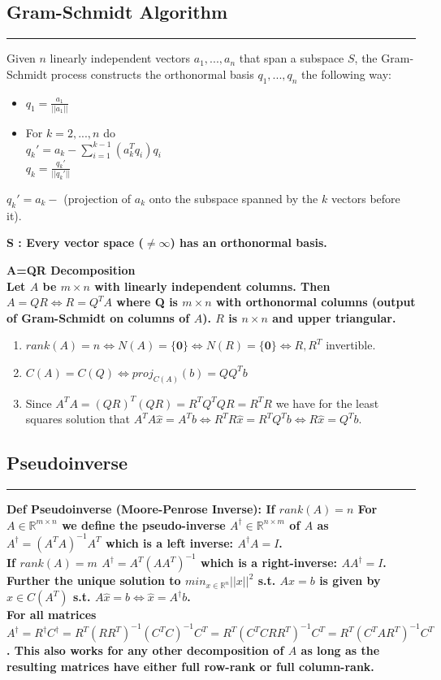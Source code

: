 \documentclass[7pt,landscape, margin = 0.1mm]{article}
\newcommand*{\mysubsection}[1]{\vspace{-2mm}\color{chaptercolor}\subsection{ #1 }
\vspace{-1mm}\hrule\vspace{1.5mm}\color{black}
\vspace{2mm}}
\newcommand{\COL}[1]{ \color{chaptercolor} \bf{#1}\color{black}     \\}
\newcommand{\DEF}[2]{\color{chaptercolor}\bf{Def #1}:\color{black}    \hspace{0.2cm} #2}
\newcommand{\SA}[2]{\color{chaptercolor}\bf{S #1}:\color{black}    \hspace{0.2cm} #2}
\begin{document}
\begin{multicols}{4}
\begin{flushleft}
{{\mysubsection{Gram-Schmidt Algorithm}
Given $n$ linearly independent vectors $a_1,...,a_n$ that span a subspace $S$, the Gram-Schmidt process constructs the orthonormal basis $q_1,...,q_n$ the following way:
\begin{itemize}
    \item $q_1=\frac{a_1}{||a_1||}$
    \item For $k=2,...,n$ do\\
    \hspace{1.8em}$q_k'=a_k-\sum_{i=1}^{k-1}(a_k^Tq_i)q_i$\\
    \hspace{1.8em}$q_k=\frac{q_k'}{||q_k'||}$
\end{itemize}
$q_k' = a_k -$ (projection of $a_k$ onto the subspace spanned by the $k$ vectors before it).

\SA{}{Every vector space ($\not=\infty$) has an orthonormal basis.}

\COL{A=QR Decomposition}
Let $A$ be $m\times n$ with linearly independent columns. Then $A=QR \Leftrightarrow R=Q^TA$ where Q is $m\times n$ with orthonormal columns (output of Gram-Schmidt on columns of $A$). $R$ is $n\times n$ and upper triangular.
\begin{enumerate}[nolistsep]
    \item $rank(A)=n \Leftrightarrow N(A)=\{\bm{0}\} \Leftrightarrow N(R)=\{\bm{0}\} \Leftrightarrow R, R^T$ invertible.
    \item $C(A)=C(Q) \Leftrightarrow proj_{C(A)}(b)=QQ^Tb$
    \item Since $A^TA=(QR)^T(QR)=R^TQ^TQR=R^TR$ we have for the least squares solution that $A^TA\hat{x}=A^Tb \Leftrightarrow R^TR\hat{x}=R^TQ^Tb \Leftrightarrow R\hat{x}=Q^Tb$.
\end{enumerate} 




\mysubsection{Pseudoinverse}
\DEF{Pseudoinverse (Moore-Penrose Inverse)}{
\color{OrangeRed}If $rank(A)=n$ \color{Black} For $A\in\mathbb{R}^{m\times n}$ we define the pseudo-inverse $A^\dag\in\mathbb{R}^{n\times m}$ of $A$ as $A^\dag=(A^TA)^{-1}A^T$ which is a left inverse: $A^\dag A=I$.\\
\color{OrangeRed}If $rank(A)=m$ \color{Black} $A^\dag=A^T(AA^T)^{-1}$ which is a right-inverse: $AA^\dag=I$. Further the unique solution to $min_{x\in\mathbb{R}^n}||x||^2$ s.t. $Ax=b$ is given by $\hat{x}\in C(A^T)$ s.t. $A\hat{x}=b \Leftrightarrow \hat{x}=A^{\dag}b$.\\
\color{OrangeRed}For all matrices \color{black} $A^\dag=R^\dag C^\dag=R^T(RR^T)^{-1}(C^TC)^{-1}C^T=R^T(C^TCRR^T)^{-1}C^T=R^T(C^TAR^T)^{-1}C^T$. This also works for any other decomposition of $A$ as long as the resulting matrices have either full row-rank or full column-rank.}

}}
\end{flushleft}
\end{multicols}
\end{document}
